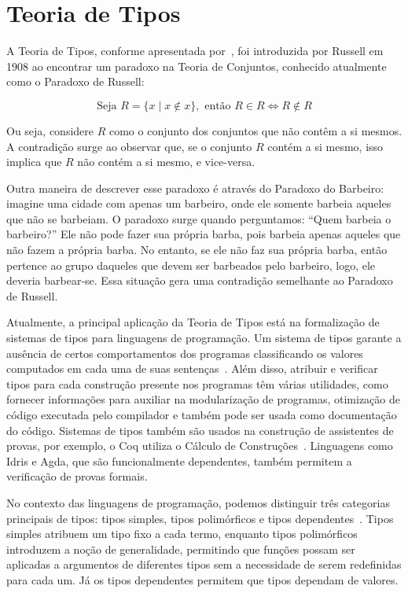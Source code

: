 \section{Teoria de Tipos}\label{sec:type-theory}

A Teoria de Tipos, conforme apresentada por~\cite{coquand2022type}, foi introduzida por Russell em 1908 ao encontrar um paradoxo na Teoria de Conjuntos, conhecido atualmente como o Paradoxo de Russell:

\begin{equation}\label{eq:russell-paradox}
  \text{Seja } R = \{ x \mid x \notin x \}, \text{ então } R \in R \iff R \notin R
\end{equation}

Ou seja, considere $R$ como o conjunto dos conjuntos que não contêm a si mesmos.
A contradição surge ao observar que, se o conjunto $R$ contém a si mesmo, isso implica que $R$ não contém a si mesmo, e vice-versa.

Outra maneira de descrever esse paradoxo é através do Paradoxo do Barbeiro: imagine uma cidade com apenas um barbeiro, onde ele somente barbeia aqueles que não se barbeiam.
O paradoxo surge quando perguntamos: ``Quem barbeia o barbeiro?''
Ele não pode fazer sua própria barba, pois barbeia apenas aqueles que não fazem a própria barba.
No entanto, se ele não faz sua própria barba, então pertence ao grupo daqueles que devem ser barbeados pelo barbeiro, logo, ele deveria barbear-se.
Essa situação gera uma contradição semelhante ao Paradoxo de Russell.

Atualmente, a principal aplicação da Teoria de Tipos está na formalização de sistemas de tipos para linguagens de programação.
Um sistema de tipos garante a ausência de certos comportamentos dos programas classificando os valores computados em cada uma de suas sentenças~\cite{pierce2002types}.
Além disso, atribuir e verificar tipos para cada construção presente nos programas têm várias utilidades, como fornecer informações para auxiliar na modularização de programas, otimização de código executada pelo compilador e também pode ser usada como documentação do código.
Sistemas de tipos também são usados na construção de assistentes de provas, por exemplo, o Coq utiliza o Cálculo de Construções~\cite{coquand1988calculus}.
Linguagens como Idris e Agda, que são funcionalmente dependentes, também permitem a verificação de provas formais.

No contexto das linguagens de programação, podemos distinguir três categorias principais de tipos: tipos simples, tipos polimórficos e tipos dependentes~\cite{pierce2002types}.
Tipos simples atribuem um tipo fixo a cada termo, enquanto tipos polimórficos introduzem a noção de generalidade, permitindo que funções possam ser aplicadas a argumentos de diferentes tipos sem a necessidade de serem redefinidas para cada um.
Já os tipos dependentes permitem que tipos dependam de valores.

